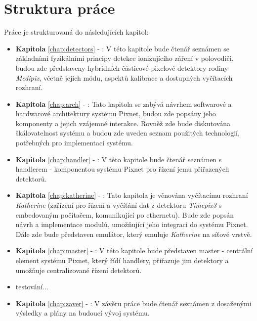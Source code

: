 \section{Struktura práce}
Práce je strukturovaná do následujících kapitol:
\begin{itemize}
    
    \item \textbf{Kapitola} \ref{chap:detectors} - : V této kapitole bude čtenář seznámen se základními fyzikálními principy detekce ionizujícího záření v polovodiči, budou zde představeny hybridních částicové pixelové detektory rodiny \textit{Medipix}, včetně jejich módu, aspektů kalibrace a dostupných vyčítacích rozhraní.
    
    \item \textbf{Kapitola} \ref{chap:arch} - : Tato kapitola se zabývá návrhem softwarové a hardwarové architektury systému Pixnet, budou zde popsány jeho komponenty a jejich vzájemné interakce. Rovněž zde bude diskutována škálovatelnost systému a budou zde uveden seznam použitých technologií, potřebných pro implementaci systému.
    
    \item \textbf{Kapitola} \ref{chap:handler} - : V této kapitole bude čtenář seznámen s handlerem - komponentou systému Pixnet pro řízení jemu přiřazených detektorů.
    
    \item \textbf{Kapitola} \ref{chap:katherine} - : Tato kapitola je věnována vyčítacímu rozhraní \textit{Katherine} (zařízení pro řízení a vyčítání dat z detektoru \textit{Timepix3} s embedovaným počítačem, komunikující po ethernetu). Bude zde popsán návrh a implementace modulů, umožňující jeho integraci do systému Pixnet. Dále zde bude představen emulátor, který emuluje \textit{Katherine} na síťové vrstvě.
    
    \item \textbf{Kapitola} \ref{chap:master} - : V této kapitole bude představen master - centrální element systému Pixnet, který řídí handlery, přiřazuje jim detektory a umožňuje centralizované řízení detektorů.
    
    \item \todo testování...
    
    \item \textbf{Kapitola} \ref{chap:zaver} - : V závěru práce bude čtenář seznámen z dosaženými výsledky a plány na budoucí vývoj systému.

\end{itemize}